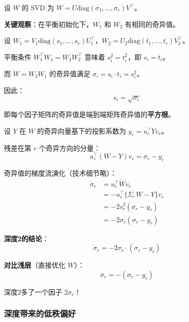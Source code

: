 \documentclass[12pt, a4paper]{ctexart}
\begin{document}
\begin{blackboard}

设 $W$ 的 SVD 为 $W = U \text{diag}(\sigma_1, \ldots, \sigma_r) V^\top$。

\textbf{关键观察}：在平衡初始化下，$W_1$ 和 $W_2$ 有相同的奇异值。

设 $W_1 = V_1 \text{diag}(s_1, \ldots, s_r) U_1^\top$，$W_2 = U_2 \text{diag}(t_1, \ldots, t_r) V_2^\top$。

平衡条件 $W_1^\top W_1 = W_2 W_2^\top$ 意味着 $s_i^2 = t_i^2$，即 $s_i = t_i$。

而 $W = W_2 W_1$ 的奇异值满足 $\sigma_i = s_i \cdot t_i = s_i^2$。

因此：
\[
\boxed{s_i = \sqrt{\sigma_i}}
\]

即每个因子矩阵的奇异值是端到端矩阵奇异值的\textbf{平方根}。

\end{blackboard}

\begin{blackboard}

设 $Y$ 在 $W$ 的奇异向量基下的投影系数为 $y_r = u_r^\top Y v_r$。

残差在第 $r$ 个奇异方向的分量：
\[
u_r^\top (W - Y) v_r = \sigma_r - y_r
\]

奇异值的梯度流演化（技术细节略）：
\begin{align*}
\dot{\sigma}_r &= u_r^\top \dot{W} v_r \\
&= -u_r^\top \{\Sigma, W - Y\} v_r \\
&= -2 s_r^2 (\sigma_r - y_r) \\
&= -2 \sigma_r (\sigma_r - y_r)
\end{align*}

\textbf{深度2的结论}：
\[
\boxed{\dot{\sigma}_r = -2\sigma_r \cdot (\sigma_r - y_r)}
\]

\textbf{对比浅层}（直接优化 $W$）：
\[
\dot{\sigma}_r = -(\sigma_r - y_r)
\]

深度2多了一个因子 $2\sigma_r$！

\end{blackboard}

\subsubsection{深度带来的低秩偏好}
\end{document}
